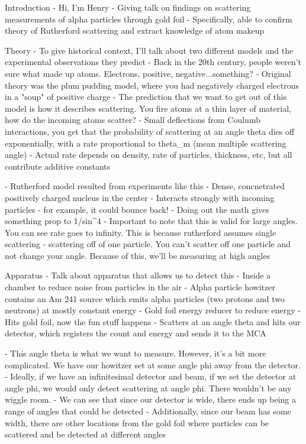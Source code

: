 Introduction
- Hi, I'm Henry
- Giving talk on findings on scattering measurements of alpha particles through gold foil
- Specifically, able to confirm theory of Rutherford scattering and extract knowledge of atom makeup

Theory
- To give historical context, I'll talk about two different models and the experimental observations they predict
- Back in the 20th century, people weren't sure what made up atoms. Electrons, positive, negative...something?
- Original theory was the plum pudding model, where you had negatively charged electrons in a "soup" of positive charge
- The prediction that we want to get out of this model is how it describes scattering. You fire atoms at a thin layer of material, how do the incoming atoms scatter?
- Small deflections from Coulumb interactions, you get that the probability of scattering at an angle theta dies off exponentially, with a rate proportional to theta_m (mean multiple scattering angle)
- Actual rate depends on density, rate of particles, thickness, etc, but all contribute additive constants

- Rutherford model resulted from experiments like this
- Dense, concnetrated positively charged nucleus in the center
- Interacts strongly with incoming particles - for example, it could bounce back!
- Doing out the math gives something prop to 1/sin^4
- Important to note that this is valid for large angles. You can see rate goes to infinity. This is because rutherford assumes single scattering - scattering off of one particle. You can't scatter off one particle and not change your angle. Because of this, we'll be measuring at high angles

Apparatus
- Talk about apparatus that allows us to detect this
- Inside a chamber to reduce noise from particles in the air
- Alpha particle howitzer contains an Am 241 source which emits alpha particles (two protons and two neutrons) at mostly constant energy
- Gold foil energy reducer to reduce energy
- Hits gold foil, now the fun stuff happens
- Scatters at an angle theta and hits our detector, which registers the count and energy and sends it to the MCA

- This angle theta is what we want to measure. However, it's a bit more complicated. We have our howitzer set at some angle phi away from the detector. 
- Ideally, if we have an infinitesimal detector and beam, if we set the detector at angle phi, we would only detect scattering at angle phi. There wouldn't be any wiggle room.
- We can see that since our detector is wide, there ends up being a range of angles that could be detected
- Additionally, since our beam has some width, there are other locations from the gold foil where particles can be scattered and be detected at different angles

